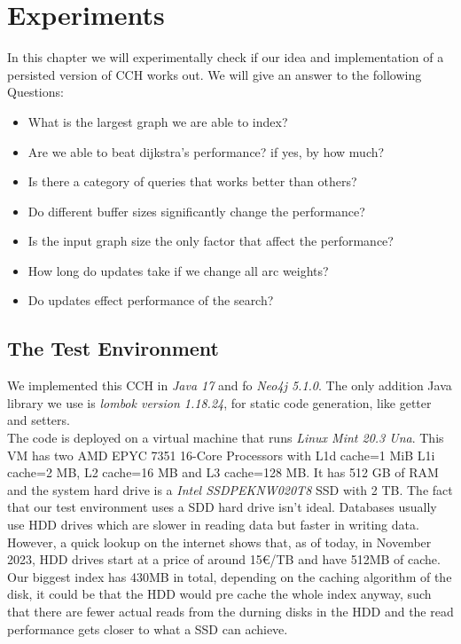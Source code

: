 \chapter{Experiments}

In this chapter we will experimentally check if our idea and implementation of a persisted version of CCH works out.
We will give an answer to the following Questions:
\begin{itemize}
    \item What is the largest graph we are able to index?
    \item Are we able to beat dijkstra's performance? if yes, by how much?
    \item Is there a category of queries that works better than others?
    \item Do different buffer sizes significantly change the performance?
    \item Is the input graph size the only factor that affect the performance?
    \item How long do updates take if we change all arc weights?
    \item Do updates effect performance of the search?
\end{itemize}

\section{The Test Environment}

We implemented this CCH in \textit{Java 17} and fo \textit{Neo4j 5.1.0}.
The only addition Java library we use is \textit{lombok version 1.18.24}, for static code generation, like getter and setters.
\\
The code is deployed on a virtual machine that runs \textit{Linux Mint 20.3 Una}.
This VM has two  AMD EPYC 7351 16-Core Processors with L1d cache=1 MiB L1i cache=2 MB, L2 cache=16 MB and L3 cache=128 MB.
It has 512 GB of RAM and the system hard drive is a \textit{Intel SSDPEKNW020T8} SSD with 2 TB.
The fact that our test environment uses a SDD hard drive isn't ideal.
Databases usually use HDD drives which are slower in reading data but faster in writing data.
However, a quick lookup on the internet shows that, as of today, in November 2023, HDD drives start at a price of around 15\euro/TB and have 512MB of cache.
Our biggest index has 430MB in total, depending on the caching algorithm of the disk, it could be that 
the HDD would pre cache the whole index anyway, such that there are fewer actual reads from the durning disks in the HDD and the read performance gets closer to what a SSD can achieve.

